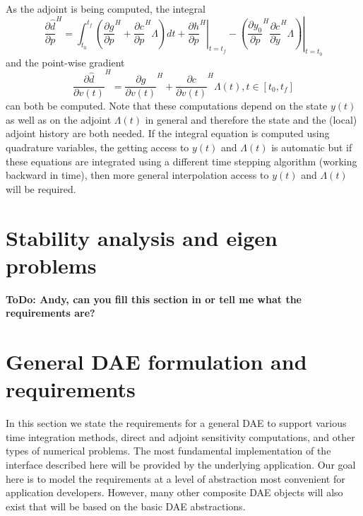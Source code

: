 \documentclass[pdf,ps2pdf,11pt]{SANDreport}
\begin{document}
As the adjoint is being computed, the integral
%
\begin{equation}
\frac{\partial \hat{d}}{\partial p}^H =
\int_{t_0}^{t_f} \left(
    \frac{\partial g}{\partial p}^H
    + \frac{\partial c}{\partial p}^H \Lambda
  \right) dt
  + \left. \frac{\partial h}{\partial p}^H \right|_{t=t_f}
  - \left. \left( \frac{\partial y_0}{\partial p}^H \frac{\partial c}{\partial \dot{y}}^H \Lambda \right) \right|_{t=t_0}
\label{rythmos:eqn:sens:d_d_hat_d_p}
\end{equation}
%
and the point-wise gradient
%
%
\begin{equation}
\frac{\partial \hat{d}}{\partial v(t)}^H
= \frac{\partial g}{\partial v(t)}^H + \frac{\partial c}{\partial v(t)}^H \Lambda(t),
t\in[t_0,t_f]
\label{rythmos:eqn:sens:d_d_hat_d_v_t}
\end{equation}
%
can both be computed.  Note that these computations depend on the state $y(t)$
as well as on the adjoint $\Lambda(t)$ in general and therefore the state and
the (local) adjoint history are both needed.  If the integral equation is
computed using quadrature variables, the getting access to $y(t)$ and
$\Lambda(t)$ is automatic but if these equations are integrated using a
different time stepping algorithm (working backward in time), then more
general interpolation access to $y(t)$ and $\Lambda(t)$ will be required.

\section{Stability analysis and eigen problems}

{}\textbf{ToDo: Andy, can you fill this section in or tell me what the
requirements are?}

\section{General DAE formulation and requirements}

In this section we state the requirements for a general DAE to support various
time integration methods, direct and adjoint sensitivity computations, and
other types of numerical problems.  The most fundamental implementation of the
interface described here will be provided by the underlying application.  Our
goal here is to model the requirements at a level of abstraction most
convenient for application developers.  However, many other composite DAE
objects will also exist that will be based on the basic DAE abstractions.
\end{document}
